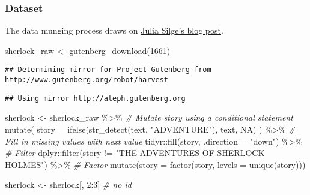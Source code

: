 \documentclass[
]{book}
\newenvironment{Shaded}{\begin{snugshade}}{\end{snugshade}}
\newcommand{\AttributeTok}[1]{\textcolor[rgb]{0.77,0.63,0.00}{#1}}
\newcommand{\CommentTok}[1]{\textcolor[rgb]{0.56,0.35,0.01}{\textit{#1}}}
\newcommand{\ConstantTok}[1]{\textcolor[rgb]{0.00,0.00,0.00}{#1}}
\newcommand{\DecValTok}[1]{\textcolor[rgb]{0.00,0.00,0.81}{#1}}
\newcommand{\FunctionTok}[1]{\textcolor[rgb]{0.00,0.00,0.00}{#1}}
\newcommand{\NormalTok}[1]{#1}
\newcommand{\OtherTok}[1]{\textcolor[rgb]{0.56,0.35,0.01}{#1}}
\newcommand{\SpecialCharTok}[1]{\textcolor[rgb]{0.00,0.00,0.00}{#1}}
\newcommand{\StringTok}[1]{\textcolor[rgb]{0.31,0.60,0.02}{#1}}
\begin{document}
\hypertarget{dataset-1}{%
\subsubsection{Dataset}\label{dataset-1}}

The data munging process draws on \href{https://juliasilge.com/blog/sherlock-holmes-stm/}{Julia Silge's blog post}.

\begin{Shaded}
\begin{Highlighting}[]
\NormalTok{sherlock\_raw }\OtherTok{\textless{}{-}} \FunctionTok{gutenberg\_download}\NormalTok{(}\DecValTok{1661}\NormalTok{)}
\end{Highlighting}
\end{Shaded}

\begin{verbatim}
## Determining mirror for Project Gutenberg from http://www.gutenberg.org/robot/harvest
\end{verbatim}

\begin{verbatim}
## Using mirror http://aleph.gutenberg.org
\end{verbatim}

\begin{Shaded}
\begin{Highlighting}[]
\NormalTok{sherlock }\OtherTok{\textless{}{-}}\NormalTok{ sherlock\_raw }\SpecialCharTok{\%\textgreater{}\%}
  \CommentTok{\# Mutate story using a conditional statement}
  \FunctionTok{mutate}\NormalTok{(}
    \AttributeTok{story =} \FunctionTok{ifelse}\NormalTok{(}\FunctionTok{str\_detect}\NormalTok{(text, }\StringTok{"ADVENTURE"}\NormalTok{), text, }\ConstantTok{NA}\NormalTok{)}
\NormalTok{  ) }\SpecialCharTok{\%\textgreater{}\%}
  \CommentTok{\# Fill in missing values with next value}
\NormalTok{  tidyr}\SpecialCharTok{::}\FunctionTok{fill}\NormalTok{(story, }\AttributeTok{.direction =} \StringTok{"down"}\NormalTok{) }\SpecialCharTok{\%\textgreater{}\%}
  \CommentTok{\# Filter}
\NormalTok{  dplyr}\SpecialCharTok{::}\FunctionTok{filter}\NormalTok{(story }\SpecialCharTok{!=} \StringTok{"THE ADVENTURES OF SHERLOCK HOLMES"}\NormalTok{) }\SpecialCharTok{\%\textgreater{}\%}
  \CommentTok{\# Factor}
  \FunctionTok{mutate}\NormalTok{(}\AttributeTok{story =} \FunctionTok{factor}\NormalTok{(story, }\AttributeTok{levels =} \FunctionTok{unique}\NormalTok{(story)))}

\NormalTok{sherlock }\OtherTok{\textless{}{-}}\NormalTok{ sherlock[, }\DecValTok{2}\SpecialCharTok{:}\DecValTok{3}\NormalTok{] }\CommentTok{\# no id}
\end{Highlighting}
\end{Shaded}
\end{document}
